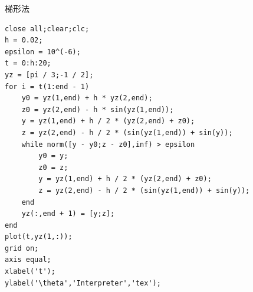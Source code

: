 \documentclass[10pt,a4paper]{article}
\begin{document}
梯形法
\begin{lstlisting}
close all;clear;clc;
h = 0.02;
epsilon = 10^(-6);
t = 0:h:20;
yz = [pi / 3;-1 / 2]; 
for i = t(1:end - 1)
    y0 = yz(1,end) + h * yz(2,end);
    z0 = yz(2,end) - h * sin(yz(1,end));
    y = yz(1,end) + h / 2 * (yz(2,end) + z0);
    z = yz(2,end) - h / 2 * (sin(yz(1,end)) + sin(y));
    while norm([y - y0;z - z0],inf) > epsilon
        y0 = y;
        z0 = z;
        y = yz(1,end) + h / 2 * (yz(2,end) + z0);
        z = yz(2,end) - h / 2 * (sin(yz(1,end)) + sin(y));
    end
    yz(:,end + 1) = [y;z];
end
plot(t,yz(1,:));
grid on;
axis equal;
xlabel('t');
ylabel('\theta','Interpreter','tex');
\end{lstlisting}
\end{document}
